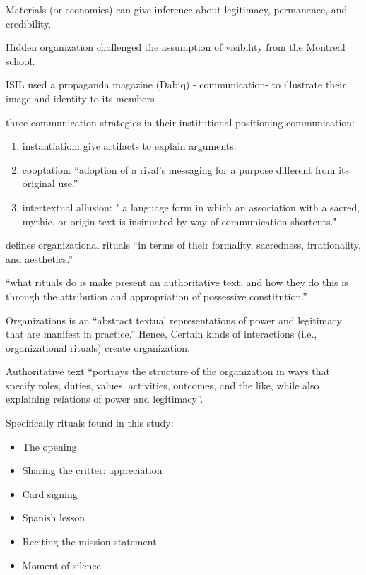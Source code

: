 \documentclass[
]{book}
\providecommand{\tightlist}{%
  \setlength{\itemsep}{0pt}\setlength{\parskip}{0pt}}
\begin{document}
Materials (or economics) can give inference about legitimacy, permanence, and credibility.

Hidden organization challenged the assumption of visibility from the Montreal school.

ISIL used a propaganda magazine (Dabiq) - communication- to illustrate their image and identity to its members

three communication strategies in their institutional positioning communication:

\begin{enumerate}
\def\labelenumi{(\arabic{enumi})}
\tightlist
\item
  instantiation: give artifacts to explain arguments.
\item
  cooptation: ``adoption of a rival's messaging for a purpose different from its original use.''
\item
  intertextual allusion: " a language form in which an association with a sacred, mythic, or origin text is insinuated
  by way of communication shortcuts."
\end{enumerate}

\citep{Koschmann_2015}

\citep{Knuf_1993} defines organizational rituals ``in terms of their formality, sacredness, irrationality, and aesthetics.''

``what rituals do is make present an authoritative text, and how they do this is through the attribution and
appropriation of possessive constitution.''

Organizations is an ``abstract textual representations of power and legitimacy that are manifest in practice.'' Hence,
Certain kinds of interactions (i.e., organizational rituals) create organization.

Authoritative text ``portrays the structure of the organization in ways that specify roles, duties, values, activities,
outcomes, and the like, while also explaining relations of power and legitimacy''.

Specifically rituals found in this study:

\begin{itemize}
\tightlist
\item
  The opening
\item
  Sharing the critter: appreciation
\item
  Card signing
\item
  Spanish lesson
\item
  Reciting the mission statement
\item
  Moment of silence
\end{itemize}
\end{document}
